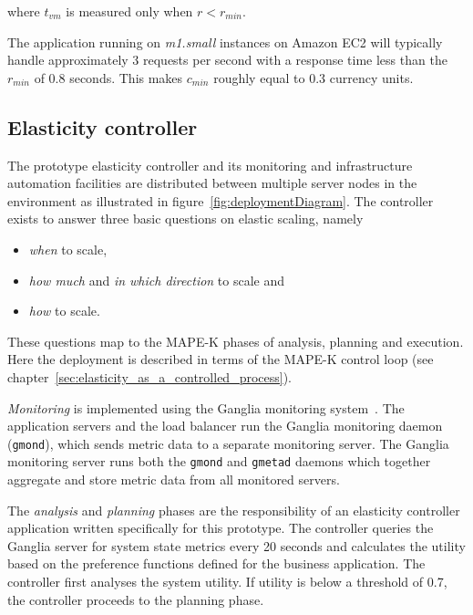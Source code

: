 \documentclass[english]{tktltiki2}
\theoremstyle{definition}
\theoremstyle{remark}
\begin{document}
where $t_{vm}$ is measured only when $r < r_{min}$. 

The application running on \textit{m1.small} instances on Amazon EC2 will
typically handle approximately 3 requests per second with a response time less
than the $r_{min}$ of 0.8 seconds. This makes $c_{min}$
roughly equal to 0.3 currency units.

\subsection{Elasticity controller}

The prototype elasticity controller and its monitoring and infrastructure automation facilities are distributed between multiple server nodes
in the environment as illustrated in figure~\ref{fig:deploymentDiagram}. The controller exists to answer three basic questions on
elastic scaling, namely 
\begin{itemize}
	\item{\textit{when} to scale,}
	\item{\textit{how much} and \textit{in which direction} to scale and}
  	\item{\textit{how} to scale}.
\end{itemize}

These questions map to the MAPE-K phases of analysis, planning and execution.
Here the deployment is described in terms of the MAPE-K control loop (see
chapter~\ref{sec:elasticity_as_a_controlled_process}).

\textit{Monitoring} is implemented using the Ganglia monitoring
system~\cite{gangliapaper}. The application servers and the load balancer run the
Ganglia monitoring daemon (\texttt{gmond}), which sends metric data to a
separate monitoring server. The Ganglia monitoring server runs both the
\texttt{gmond} and \texttt{gmetad} daemons which together aggregate and store metric
data from all monitored servers. 

The \textit{analysis} and \textit{planning} phases are the responsibility of an
elasticity controller application written specifically for this prototype. The
controller queries the Ganglia server for system state metrics every 20 seconds
and calculates the utility based on the preference functions defined for the
business application. The controller first analyses the system utility. If
utility is below a threshold of 0.7, the controller proceeds to the planning phase.
\end{document}
